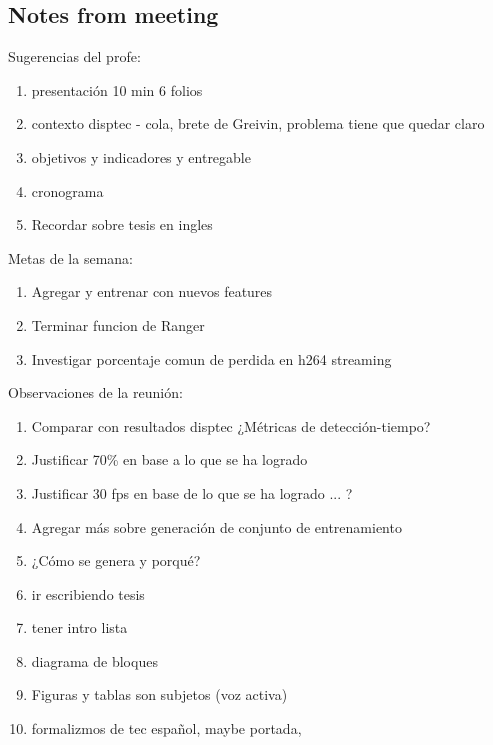 \documentclass[12pt,oneside]{book}
\begin{document}
  \subsection*{Notes from meeting}

  Sugerencias del profe:
  \begin{enumerate}
    \item presentación 10 min 6 folios
    \item contexto disptec - cola, brete de Greivin, problema tiene que quedar claro
    \item objetivos y indicadores y entregable
    \item cronograma
    \item Recordar sobre tesis en ingles
  \end{enumerate}

  Metas de la semana:
  \begin{enumerate}
    \item Agregar y entrenar con nuevos features
    \item Terminar funcion de Ranger
    \item Investigar porcentaje comun de perdida en h264 streaming
  \end{enumerate}

  Observaciones de la reunión:
  \begin{enumerate}
    \item Comparar con resultados disptec ¿Métricas de detección-tiempo?
    \item Justificar 70\% en base a lo que se ha logrado
    \item Justificar 30 fps en base de lo que se ha logrado ... ?
    \item Agregar más sobre generación de conjunto de entrenamiento
    \item ¿Cómo se genera y porqué?
    \item ir escribiendo tesis
    \item tener intro lista
    \item diagrama de bloques
    \item Figuras y tablas son subjetos (voz activa)
    \item formalizmos de tec español, maybe portada, 
  \end{enumerate}
\end{document}
